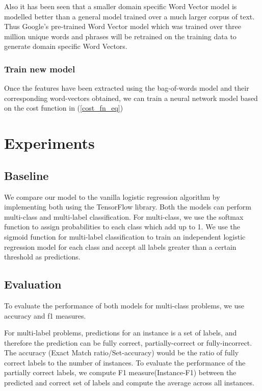 Also it has been seen that a smaller domain specific Word Vector model is modelled better than a general model trained over a much larger corpus of text. Thus Google's pre-trained Word Vector model which was trained over three million unique words and phrases will be retrained on the training data to generate domain specific Word Vectors.

\subsection{Train new model}

Once the features have been extracted using the bag-of-words model and their corresponding word-vectors obtained, we can train a neural network model based on the cost function in (\ref{cost_fn_eq})

\chapter{Experiments}

\section{Baseline}

We compare our model to the vanilla logistic regression algorithm by implementing both using the TensorFlow library. Both the models can perform multi-class and multi-label classification. For multi-class, we use the softmax function to assign probabilities to each class which add up to 1. We use the sigmoid function for multi-label classification to train an independent logistic regression model for each class and accept all labels greater than a certain threshold as predictions.

\section{Evaluation}

To evaluate the performance of both models for multi-class problems, we use accuracy and f1 measures.

For multi-label problems, predictions for an instance is a set of labels, and therefore the prediction can be fully correct, partially-correct or fully-incorrect. The accuracy (Exact Match ratio/Set-accuracy) would be the ratio of fully correct labels to the number of instances. To evaluate the performance of the partially correct labels, we compute F1 measure(Instance-F1) between the predicted and correct set of labels 
and compute the average across all instances.

